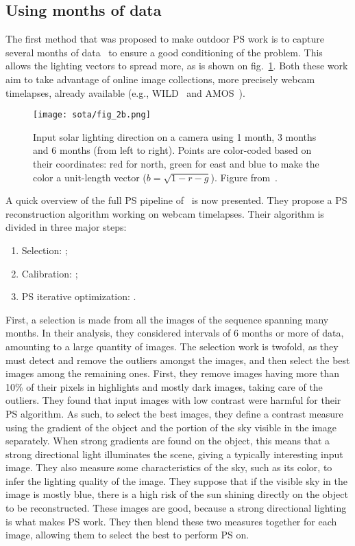\subsection{Using months of data}
\label{sota:ops-months}

The first method that was proposed to make outdoor PS work is to capture several months of data~\cite{ackermann-cvpr-12,abrams-eccv-12} to ensure a good conditioning of the problem. This allows the lighting vectors to spread more, as is shown on fig.~\ref{fig:abrams-sunpath}. Both these work aim to take advantage of online image collections, more precisely webcam timelapses, already available (e.g., WILD~\cite{narasimhan-eccv-06} and AMOS~\cite{jacobs-cvpr-2007}).

\begin{figure}
\centering
\texttt{[image: sota/fig\_2b.png]}
\caption{Input solar lighting direction on a camera using 1 month, 3 months and 6 months (from left to right). Points are color-coded based on their coordinates: red for north, green for east and blue to make the color a unit-length vector ($b = \sqrt{1 - r - g}$). Figure from~\cite{abrams-eccv-12}.}
\label{fig:abrams-sunpath}
\end{figure}

A quick overview of the full PS pipeline of~\cite{ackermann-cvpr-12} is now presented. They propose a PS reconstruction algorithm working on webcam timelapses. Their algorithm is divided in three major steps: 
\begin{enumerate}
  \item Selection: ;
  \item Calibration: ;
  \item PS iterative optimization: .
\end{enumerate}%
First, a selection is made from all the images of the sequence spanning many months. In their analysis, they considered intervals of 6 months or more of data, amounting to a large quantity of images. The selection work is twofold, as they must detect and remove the outliers amongst the images, and then select the best images among the remaining ones. First, they remove images having more than 10\% of their pixels in highlights and mostly dark images, taking care of the outliers. They found that input images with low contrast were harmful for their PS algorithm. As such, to select the best images, they define a contrast measure using the gradient of the object and the portion of the sky visible in the image separately. When strong gradients are found on the object, this means that a strong directional light illuminates the scene, giving a typically interesting input image. They also measure some characteristics of the sky, such as its color, to infer the lighting quality of the image. They suppose that if the visible sky in the image is mostly blue, there is a high risk of the sun shining directly on the object to be reconstructed. These images are good, because a strong directional lighting is what makes PS work. They then blend these two measures together for each image, allowing them to select the best to perform PS on.

